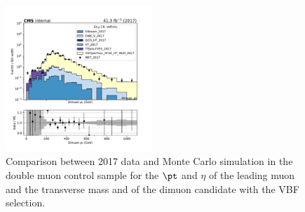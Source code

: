 \begin{figure}[htbp]
\begin{center}
        \includegraphics[width=0.49\textwidth]{fig/datamc/cr_2m_vbf/cr_2m_vbf_dimuon_pt_losf_2017.pdf}
    \end{center}
    \caption{Comparison between 2017 data and Monte Carlo simulation in the double muon control sample for
        the $\pt$ and $\eta$ of the leading muon and the transverse mass and \pt of the dimuon candidate with the VBF selection.}
    \label{fig:DM_2_vbfhinv_2017}
\end{figure}

